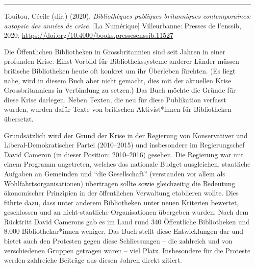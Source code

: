 \documentclass[a4paper,
fontsize=11pt,
oneside,
numbers=noperiodatend,
parskip=half-,
bibliography=totoc,
final
]{scrartcl}
\begin{document}
\begin{center}\rule{0.5\linewidth}{0.5pt}\end{center}

Touitou, Cécile (dir.) (2020). \emph{Bibliothèques publiques
britanniques contemporaines: autopsie des années de crise.} {[}La
Numérique{]} Villeurbanne: Presses de l'enssib, 2020,
\url{https://doi.org/10.4000/books.pressesenssib.11527}

Die Öffentlichen Bibliotheken in Grossbritannien sind seit Jahren in
einer profunden Krise. Einst Vorbild für Bibliothekssysteme anderer
Länder müssen britische Bibliotheken heute oft konkret um ihr Überleben
fürchten. (Es liegt nahe, wird in diesem Buch aber nicht gemacht, dies
mit der aktuellen Krise Grossbritanniens in Verbindung zu setzen.) Das
Buch möchte die Gründe für diese Krise darlegen. Neben Texten, die neu
für diese Publikation verfasst wurden, wurden dafür Texte von britischen
Aktivist*innen für Bibliotheken übersetzt.

Grundsätzlich wird der Grund der Krise in der Regierung von
Konservativer und Liberal-Demokratischer Partei (2010--2015) und
insbesondere im Regierungschef David Cameron (in dieser Position:
2010--2016) gesehen. Die Regierung war mit einem Programm angetreten,
welches das nationale Budget ausgleichen, staatliche Aufgaben an
Gemeinden und \enquote{die Gesellschaft} (verstanden vor allem als
Wohlfahrtsorganisationen) übertragen sollte sowie gleichzeitig die
Bedeutung ökonomischer Prinzipien in der öffentlichen Verwaltung
etablieren wollte. Dies führte dazu, dass unter anderem Bibliotheken
unter neuen Kriterien bewertet, geschlossen und an nicht-staatliche
Organisationen übergeben wurden. Nach dem Rücktritt David Camerons gab
es im Land rund 340 Öffentliche Bibliotheken und 8.000
Bibliothekar*innen weniger. Das Buch stellt diese Entwicklungen dar und
bietet auch den Protesten gegen diese Schliessungen -- die zahlreich und
von verschiedenen Gruppen getragen waren -- viel Platz. Insbesondere für
die Proteste werden zahlreiche Beiträge aus diesen Jahren direkt
zitiert.
\end{document}
